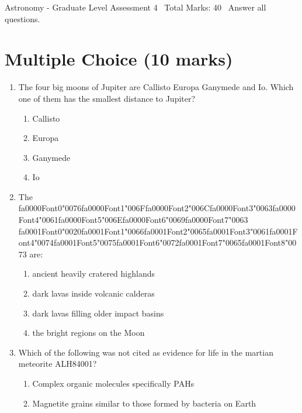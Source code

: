 \documentclass[12pt]{article}
\begin{document}
\begin{center}
Astronomy - Graduate Level Assessment 4 \
Total Marks: 40 \
Answer all questions.
\end{center}

\section*{Multiple Choice (10 marks)}
\begin{enumerate}[label=\arabic*.]
\item The four big moons of Jupiter are Callisto Europa Ganymede and Io. Which one of them has
the smallest distance to Jupiter?
\begin{enumerate}[label=(\alph*)]
    \item Callisto
    \item Europa
    \item Ganymede
    \item Io
\end{enumerate}
\item The {\csname fa0000Font0\endcsname\char"0076}{\csname fa0000Font1\endcsname\char"006F}{\csname fa0000Font2\endcsname\char"006C}{\csname fa0000Font3\endcsname\char"0063}{\csname fa0000Font4\endcsname\char"0061}{\csname fa0000Font5\endcsname\char"006E}{\csname fa0000Font6\endcsname\char"0069}{\csname fa0000Font7\endcsname\char"0063} {\csname fa0001Font0\endcsname\char"0020}{\csname fa0001Font1\endcsname\char"0066}{\csname fa0001Font2\endcsname\char"0065}{\csname fa0001Font3\endcsname\char"0061}{\csname fa0001Font4\endcsname\char"0074}{\csname fa0001Font5\endcsname\char"0075}{\csname fa0001Font6\endcsname\char"0072}{\csname fa0001Font7\endcsname\char"0065}{\csname fa0001Font8\endcsname\char"0073} are:
\begin{enumerate}[label=(\alph*)]
    \item ancient heavily cratered highlands
    \item dark lavas inside volcanic calderas
    \item dark lavas filling older impact basins
    \item the bright regions on the Moon
\end{enumerate}
\item Which of the following was not cited as evidence for life in the martian meteorite
ALH84001?
\begin{enumerate}[label=(\alph*)]
    \item Complex organic molecules specifically PAHs
    \item Magnetite grains similar to those formed by bacteria on Earth

\end{enumerate}
\end{enumerate}
\end{document}
